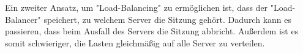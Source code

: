 Ein zweiter Ansatz, um "Load-Balancing" zu ermöglichen ist, dass der "Load-Balancer" speichert, zu welchem Server die Sitzung gehört. Dadurch kann es passieren, dass beim Ausfall des Servers die Sitzung abbricht. Außerdem ist es somit schwieriger, die Lasten gleichmäßig auf alle Server zu verteilen.



\clearpage


